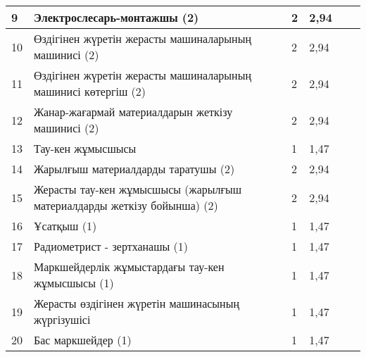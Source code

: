 \begin{longtable}[c]{|llllll|}
\multicolumn{1}{|l|}{9} & \multicolumn{1}{p{0.5\textwidth}|}{Электрослесарь-монтажшы (2)} & \multicolumn{1}{l|}{2} & \multicolumn{1}{l|}{2,94} & \multicolumn{1}{l|}{} &  \\ \hline
\multicolumn{1}{|l|}{10} & \multicolumn{1}{p{0.5\textwidth}|}{Өздігінен жүретін жерасты машиналарының машинисі (2)} & \multicolumn{1}{l|}{2} & \multicolumn{1}{l|}{2,94} & \multicolumn{1}{l|}{} &  \\ \hline
\multicolumn{1}{|l|}{11} & \multicolumn{1}{p{0.5\textwidth}|}{Өздігінен жүретін жерасты машиналарының машинисі көтергіш (2)} & \multicolumn{1}{l|}{2} & \multicolumn{1}{l|}{2,94} & \multicolumn{1}{l|}{} &  \\ \hline
\multicolumn{1}{|l|}{12} & \multicolumn{1}{p{0.5\textwidth}|}{Жанар-жағармай материалдарын жеткізу машинисі (2)} & \multicolumn{1}{l|}{2} & \multicolumn{1}{l|}{2,94} & \multicolumn{1}{l|}{} &  \\ \hline
\multicolumn{1}{|l|}{13} & \multicolumn{1}{p{0.5\textwidth}|}{Тау-кен жұмысшысы} & \multicolumn{1}{l|}{1} & \multicolumn{1}{l|}{1,47} & \multicolumn{1}{l|}{} &  \\ \hline
\multicolumn{1}{|l|}{14} & \multicolumn{1}{p{0.5\textwidth}|}{Жарылғыш материалдарды таратушы (2)} & \multicolumn{1}{l|}{2} & \multicolumn{1}{l|}{2,94} & \multicolumn{1}{l|}{} &  \\ \hline
\multicolumn{1}{|l|}{15} & \multicolumn{1}{p{0.5\textwidth}|}{Жерасты тау-кен жұмысшысы (жарылғыш материалдарды жеткізу бойынша) (2)} & \multicolumn{1}{l|}{2} & \multicolumn{1}{l|}{2,94} & \multicolumn{1}{l|}{} &  \\ \hline
\multicolumn{1}{|l|}{16} & \multicolumn{1}{p{0.5\textwidth}|}{Ұсатқыш (1)} & \multicolumn{1}{l|}{1} & \multicolumn{1}{l|}{1,47} & \multicolumn{1}{l|}{} &  \\ \hline
\multicolumn{1}{|l|}{17} & \multicolumn{1}{p{0.5\textwidth}|}{Радиометрист - зертханашы (1)} & \multicolumn{1}{l|}{1} & \multicolumn{1}{l|}{1,47} & \multicolumn{1}{l|}{} &  \\ \hline
\multicolumn{1}{|l|}{18} & \multicolumn{1}{p{0.5\textwidth}|}{Маркшейдерлік жұмыстардағы тау-кен жұмысшысы (1)} & \multicolumn{1}{l|}{1} & \multicolumn{1}{l|}{1,47} & \multicolumn{1}{l|}{} &  \\ \hline
\multicolumn{1}{|l|}{19} & \multicolumn{1}{p{0.5\textwidth}|}{Жерасты өздігінен жүретін машинасының жүргізушісі} & \multicolumn{1}{l|}{1} & \multicolumn{1}{l|}{1,47} & \multicolumn{1}{l|}{} &  \\ \hline
\multicolumn{1}{|l|}{20} & \multicolumn{1}{p{0.5\textwidth}|}{Бас маркшейдер (1)} & \multicolumn{1}{l|}{1} & \multicolumn{1}{l|}{1,47} & \multicolumn{1}{l|}{} &  \\ \hline

\end{longtable}
